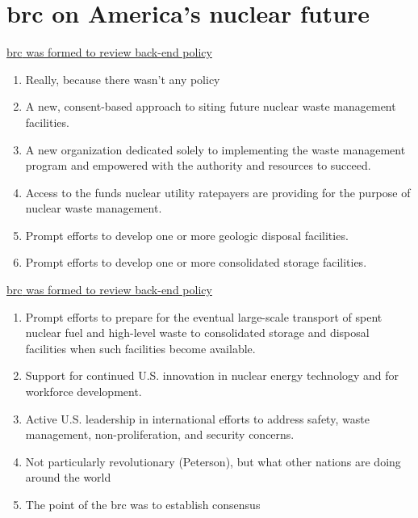 \documentclass[aspectratio=1610,pdftex,dvipsnames,compress,xcolor={dvipsnames}]{beamer}
\newcommand{\acl}{\acrlong} %
\newcommand{\acs}{\acrshort} %
\begin{document}
\section{\acl{brc} on America's nuclear future}


\addtocounter{framenumber}{-3} 
\begin{frame}{\href{https://uidaho.pressbooks.pub/nuclearengineering/chapter/back-end-of-the-fuel-cycle/}{\acl{brc} was formed to review back-end policy}}
    \begin{enumerate}[series=blue,topsep=0pt,itemsep=21pt,leftmargin=*,label=(\arabic*)]
        \item[]Really, because there wasn't any policy
            \vspace{0.05in}
        \item A new, consent-based approach to siting future nuclear waste management facilities.
        \item A new organization dedicated solely to implementing the waste management program and empowered with the authority and resources to succeed.
        \item Access to the funds nuclear utility ratepayers are providing for the purpose of nuclear waste management.
        \item Prompt efforts to develop one or more geologic disposal facilities.
        \item Prompt efforts to develop one or more consolidated storage facilities.
    \end{enumerate}
\end{frame}


\begin{frame}{\href{https://uidaho.pressbooks.pub/nuclearengineering/chapter/back-end-of-the-fuel-cycle/}{\acl{brc} was formed to review back-end policy}}
    \begin{enumerate}[resume=blue,topsep=0pt,itemsep=21pt,leftmargin=*,label=(\arabic*)]
        \item Prompt efforts to prepare for the eventual large-scale transport of spent nuclear fuel and high-level waste to consolidated storage and disposal facilities when such facilities become available.
        \item Support for continued U.S. innovation in nuclear energy technology and for workforce development.
        \item Active U.S. leadership in international efforts to address safety, waste management, non-proliferation, and
            \vspace{0.05in}
security concerns.
        \item[] Not particularly revolutionary (Peterson), but what other nations are doing around the world
        \item[] The point of the \acs{brc} was to establish consensus
    \end{enumerate}
\end{frame}
\end{document}
